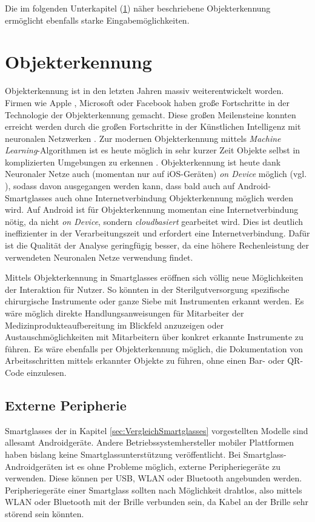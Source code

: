 Die im folgenden Unterkapitel (\ref{sec:Objekterkennung}) näher beschriebene Objekterkennung ermöglicht ebenfalls starke Eingabemöglichkeiten.
%
%
%
%
%
%
\section{Objekterkennung}
\label{sec:Objekterkennung}
Objekterkennung ist in den letzten Jahren massiv weiterentwickelt worden. Firmen wie Apple \cite{Apple2018b}, Microsoft \cite{Girshick2015} oder Facebook \cite{Schroepfer2015} haben große Fortschritte in der Technologie der Objekterkennung gemacht. Diese großen Meilensteine konnten erreicht werden durch die großen Fortschritte in der Künstlichen Intelligenz mit neuronalen Netzwerken \cite{Apple2018b, Schroepfer2015}. Zur modernen Objekterkennung mittels \emph{Machine Learning}-Algorithmen ist es heute möglich in sehr kurzer Zeit Objekte selbst in komplizierten Umgebungen zu erkennen \cite{Schroepfer2015}. 
Objekterkennung ist heute dank Neuronaler Netze auch (momentan nur auf iOS-Geräten) \emph{on Device} möglich (vgl. \cite{Apple2018b}), sodass davon ausgegangen werden kann, dass bald auch auf Android-Smartglasses auch ohne Internetverbindung Objekterkennung möglich werden wird. Auf Android ist für Objekterkennung momentan eine Internetverbindung nötig, da nicht \emph{on Device}, sondern \emph{cloudbasiert} gearbeitet wird. Dies ist deutlich ineffizienter in der Verarbeitungszeit und erfordert eine Internetverbindung. Dafür ist die Qualität der Analyse geringfügig besser, da eine höhere Rechenleistung der verwendeten Neuronalen Netze verwendung findet.

Mittels Objekterkennung in Smartglasses eröffnen sich völlig neue Möglichkeiten der Interaktion für Nutzer. So könnten in der Sterilgutversorgung spezifische chirurgische Instrumente oder ganze Siebe mit Instrumenten erkannt werden. Es wäre möglich direkte Handlungsanweisungen für Mitarbeiter der Medizinprodukteaufbereitung im Blickfeld anzuzeigen oder Austauschmöglichkeiten mit Mitarbeitern über konkret erkannte Instrumente zu führen. Es wäre ebenfalls per Objekterkennung möglich, die Dokumentation von Arbeitsschritten mittels erkannter Objekte zu führen, ohne einen Bar- oder QR-Code einzulesen.
%
%
%
%
%
%
\subsection{Externe Peripherie}
\label{sec:Externe_Peripherie}
Smartglasses der in Kapitel \ref{sec:VergleichSmartglasses} vorgestellten Modelle sind allesamt Androidgeräte. Andere Betriebssystemhersteller mobiler Plattformen haben bislang keine Smartglassunterstützung veröffentlicht. Bei Smartglass-Androidgeräten ist es ohne Probleme möglich, externe Peripheriegeräte zu verwenden. Diese können per USB, WLAN oder Bluetooth angebunden werden.  Peripheriegeräte einer Smartglass sollten nach Möglichkeit drahtlos, also mittels WLAN oder Bluetooth mit der Brille verbunden sein, da Kabel an der Brille sehr störend sein könnten. 

